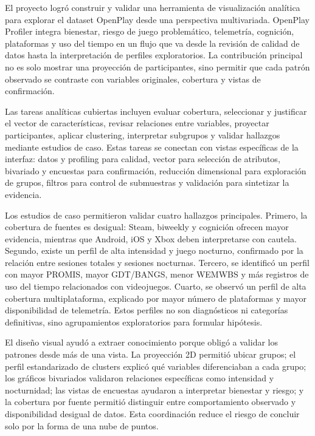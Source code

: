 \documentclass[12pt,a4paper]{article}
\begin{document}
El proyecto logr\'o construir y validar una herramienta de visualizaci\'on anal\'itica para explorar el dataset OpenPlay desde una perspectiva multivariada. OpenPlay Profiler integra bienestar, riesgo de juego problem\'atico, telemetr\'ia, cognici\'on, plataformas y uso del tiempo en un flujo que va desde la revisi\'on de calidad de datos hasta la interpretaci\'on de perfiles exploratorios. La contribuci\'on principal no es solo mostrar una proyecci\'on de participantes, sino permitir que cada patr\'on observado se contraste con variables originales, cobertura y vistas de confirmaci\'on.

Las tareas anal\'iticas cubiertas incluyen evaluar cobertura, seleccionar y justificar el vector de caracter\'isticas, revisar relaciones entre variables, proyectar participantes, aplicar clustering, interpretar subgrupos y validar hallazgos mediante estudios de caso. Estas tareas se conectan con vistas espec\'ificas de la interfaz: datos y profiling para calidad, vector para selecci\'on de atributos, bivariado y encuestas para confirmaci\'on, reducci\'on dimensional para exploraci\'on de grupos, filtros para control de submuestras y validaci\'on para sintetizar la evidencia.

Los estudios de caso permitieron validar cuatro hallazgos principales. Primero, la cobertura de fuentes es desigual: Steam, biweekly y cognici\'on ofrecen mayor evidencia, mientras que Android, iOS y Xbox deben interpretarse con cautela. Segundo, existe un perfil de alta intensidad y juego nocturno, confirmado por la relaci\'on entre sesiones totales y sesiones nocturnas. Tercero, se identific\'o un perfil con mayor PROMIS, mayor GDT/BANGS, menor WEMWBS y m\'as registros de uso del tiempo relacionados con videojuegos. Cuarto, se observ\'o un perfil de alta cobertura multiplataforma, explicado por mayor n\'umero de plataformas y mayor disponibilidad de telemetr\'ia. Estos perfiles no son diagn\'osticos ni categor\'ias definitivas, sino agrupamientos exploratorios para formular hip\'otesis.

El dise\~no visual ayud\'o a extraer conocimiento porque oblig\'o a validar los patrones desde m\'as de una vista. La proyecci\'on 2D permiti\'o ubicar grupos; el perfil estandarizado de clusters explic\'o qu\'e variables diferenciaban a cada grupo; los gr\'aficos bivariados validaron relaciones espec\'ificas como intensidad y nocturnidad; las vistas de encuestas ayudaron a interpretar bienestar y riesgo; y la cobertura por fuente permiti\'o distinguir entre comportamiento observado y disponibilidad desigual de datos. Esta coordinaci\'on reduce el riesgo de concluir solo por la forma de una nube de puntos.
\end{document}
